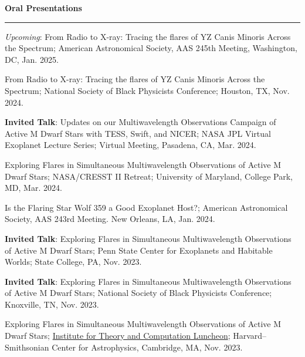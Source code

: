 \documentclass[letter,12pt]{article}
\begin{document}
\noindent
{\bf Oral Presentations} \\
\vspace{-10mm}
\begin{center}
\rule{\textwidth}{0.2mm}
\end{center}
\vspace{-3mm}
\noindent
\begin{etaremune}
\renewcommand\labelenumi{\bfseries\theenumi .}
\item \textit{Upcoming}: From Radio to X-ray: Tracing the flares of YZ Canis Minoris Across the Spectrum; American Astronomical Society, AAS 245th Meeting, Washington, DC, Jan. 2025.

\item From Radio to X-ray: Tracing the flares of YZ Canis Minoris Across the Spectrum; National Society of Black Physicists Conference; Houston, TX, Nov. 2024.

\item \textbf{Invited Talk}: Updates on our Multiwavelength Observations Campaign of Active M Dwarf Stars with TESS, Swift, and NICER; NASA JPL Virtual Exoplanet Lecture Series; Virtual Meeting, Pasadena, CA, Mar. 2024. 

\item Exploring Flares in Simultaneous Multiwavelength Observations of Active M Dwarf Stars; NASA/CRESST II Retreat; University of Maryland, College Park, MD, Mar. 2024. 

\item Is the Flaring Star Wolf 359 a Good Exoplanet Host?; American Astronomical Society, AAS 243rd Meeting. New Orleans, LA, Jan. 2024.

\item \textbf{Invited Talk}: Exploring Flares in Simultaneous Multiwavelength Observations of Active M Dwarf Stars; Penn State Center for Exoplanets and Habitable Worlds; State College, PA, Nov. 2023.

\item \textbf{Invited Talk}: Exploring Flares in Simultaneous Multiwavelength Observations of Active M Dwarf Stars; National Society of Black Physicists Conference; Knoxville, TN, Nov. 2023.

\item Exploring Flares in Simultaneous Multiwavelength Observations of Active M Dwarf Stars; \href{https://itc.cfa.harvard.edu/event/itc-luncheon-112}{Institute for Theory and Computation Luncheon}; Harvard--Smithsonian Center for Astrophysics, Cambridge, MA, Nov. 2023.


\end{etaremune}
\end{document}
